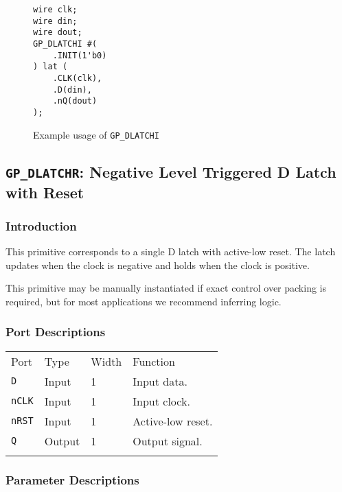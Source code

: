 \documentclass[11pt]{article}
\newcommand{\tokenstyle}[1]{\texttt{#1}}
\newcommand{\whenstyle}[1]{{\fontseries{sb}\selectfont#1}}
\newcommand{\thinhline}{\Xhline{1\arrayrulewidth}}
\newcommand{\thickhline}{\Xhline{2.5\arrayrulewidth}}
\begin{document}
\begin{figure}[h]
\begin{lstlisting}
wire clk;
wire din;
wire dout;
GP_DLATCHI #(
	.INIT(1'b0)
) lat (
	.CLK(clk),
	.D(din),
	.nQ(dout)
);
\end{lstlisting}
\caption{Example usage of \tokenstyle{GP\_DLATCHI}}
\label{gp-dlatchi-example}
\end{figure}


\pagebreak
\subsection{\tokenstyle{GP\_DLATCHR}: Negative Level Triggered D Latch with Reset}
\label{gp-latchr}

\subsubsection{Introduction}
This primitive corresponds to a single D latch with active-low reset. The latch updates when the clock is negative and holds 
when the clock is positive.

This primitive may be manually instantiated if exact control over packing is required, but for most applications we
recommend inferring logic.

\subsubsection{Port Descriptions}

\begin{tabularx}{\textwidth}{lllX}
\thinhline
\whenstyle{Port} & \whenstyle{Type} & \whenstyle{Width} & \whenstyle{Function} \\
\thickhline
\tokenstyle{D} & Input & 1 & Input data. \\
\thinhline
\tokenstyle{nCLK} & Input & 1 & Input clock. \\
\thinhline
\tokenstyle{nRST} & Input & 1 & Active-low reset. \\
\thinhline
\tokenstyle{Q} & Output & 1 & Output signal. \\
\thinhline
\end{tabularx}

\subsubsection{Parameter Descriptions}
\end{document}
